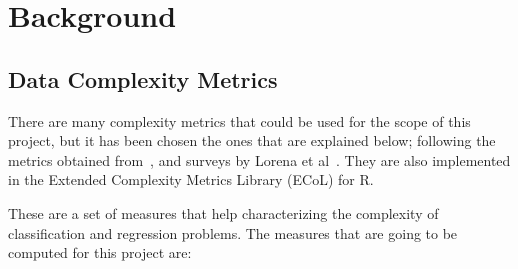 %
%
%
% 
%
%
%
%

\chapter{Background}\label{chp:background}

\section{Data Complexity Metrics}\label{sec:ecol}

There are many complexity metrics that could be used for the scope of this 
project, but it has been chosen the ones that are explained below; following 
the metrics obtained from~\cite{BasuH2006}, and surveys by Lorena et 
al~\cite{lorena2018,Lorena2019}. They are also implemented in the Extended 
Complexity Metrics Library (ECoL) for R.

These are a set of measures that help characterizing the complexity of 
classification and regression problems. The measures that are going to be 
computed for this project are:

